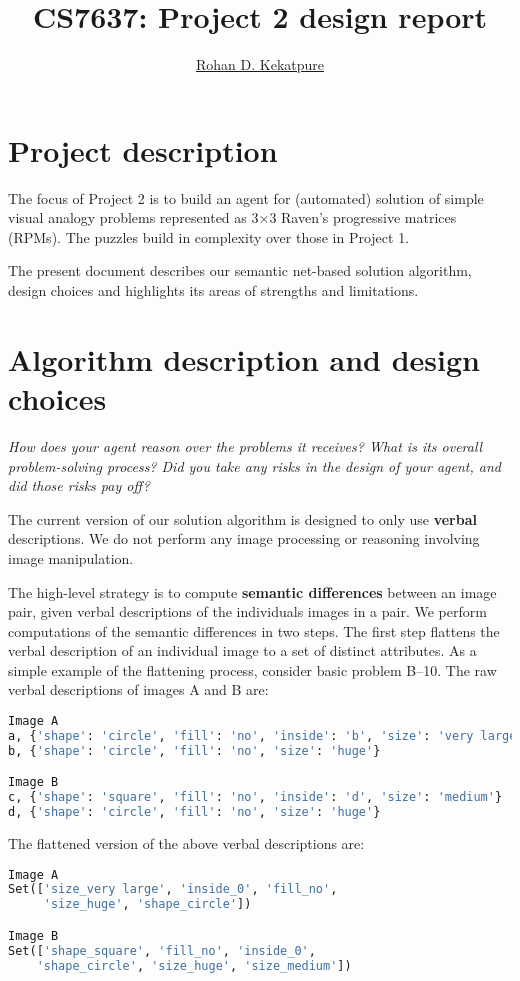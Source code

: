 \documentclass[10pt,letterpaper]{article}
\newcommand{\mypar}{\par{\vspace{0.2cm}}}
\newcommand{\rubric}[1]{\mypar{}\textcolor{mygray}{\emph{#1}}\mypar{}}
\begin{document}
\title{\Large{CS7637: Project 2 design report}}
\author{\href{mailto:rohan.kekatpure@gmail.com}{Rohan D. Kekatpure}}
\address{}
\email{}

\section{Project description}
The focus of Project 2 is to build an agent for (automated) solution of simple visual analogy problems represented as 3$\times$3 Raven's progressive matrices (RPMs). The puzzles build in complexity over those in Project 1. 

The present document describes our semantic net-based solution algorithm, design choices and highlights its areas of strengths and limitations. 

\section{Algorithm description and design choices}
\rubric {How does your agent reason over the problems it receives? What is its overall problem-solving process? Did you take any risks in the design of your agent, and did those risks pay off?}
The current version of our solution algorithm is designed to only use {\bf verbal} descriptions. We do not perform any image processing or reasoning involving image manipulation. 

The high-level strategy is to compute {\bf semantic differences} between an image pair, given verbal descriptions of the individuals images in a pair. We perform computations of the semantic differences in two steps. The first step flattens the verbal description of an individual image to a set of distinct attributes. As a simple example of the flattening process, consider basic problem B--10. The raw verbal descriptions of images A and B are:
\begin{small}
\begin{lstlisting}[language=python]
Image A
a, {'shape': 'circle', 'fill': 'no', 'inside': 'b', 'size': 'very large'}
b, {'shape': 'circle', 'fill': 'no', 'size': 'huge'}

Image B
c, {'shape': 'square', 'fill': 'no', 'inside': 'd', 'size': 'medium'}
d, {'shape': 'circle', 'fill': 'no', 'size': 'huge'}
\end{lstlisting}
\end{small}
The flattened version of the above verbal descriptions are:
\begin{small}
\begin{lstlisting}[language=python]
Image A
Set(['size_very large', 'inside_0', 'fill_no', 
     'size_huge', 'shape_circle'])

Image B
Set(['shape_square', 'fill_no', 'inside_0', 
    'shape_circle', 'size_huge', 'size_medium'])
\end{lstlisting}
\end{small}
\end{document}
